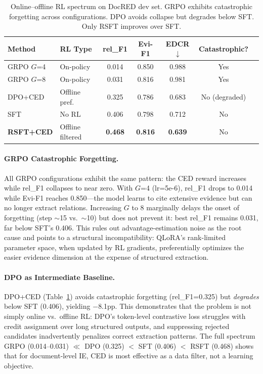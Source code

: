 \documentclass[11pt,a4paper]{article}
\newcommand{\ced}{CED}
\newcommand{\edcr}{EDCR}
\newcommand{\rsft}{RSFT}
\begin{document}
\begin{table}[t]
\centering
\small
\caption{Online--offline RL spectrum on DocRED dev set. GRPO exhibits catastrophic forgetting across configurations. DPO avoids collapse but degrades below SFT. Only \rsft{} improves over SFT.}
\label{tab:rl_spectrum}
\begin{tabular}{@{}llccccc@{}}
\toprule
\textbf{Method} & \textbf{RL Type} & \textbf{rel\_F1} & \textbf{Evi-F1} & \textbf{\edcr{}$\downarrow$} & \textbf{Catastrophic?} \\
\midrule
GRPO $G$=4    & On-policy   & 0.014 & 0.850 & 0.988 & Yes \\
GRPO $G$=8    & On-policy   & 0.031 & 0.816 & 0.981 & Yes \\
DPO+CED       & Offline pref. & 0.325 & 0.786 & 0.683 & No (degraded) \\
SFT            & No RL       & 0.406 & 0.798 & 0.712 & No \\
\textbf{\rsft{}+CED} & Offline filtered & \textbf{0.468} & \textbf{0.816} & \textbf{0.639} & No \\
\bottomrule
\end{tabular}
\end{table}

\paragraph{GRPO Catastrophic Forgetting.}
All GRPO configurations exhibit the same pattern: the CED reward increases while rel\_F1 collapses to near zero.
With $G$=4 (lr=5e-6), rel\_F1 drops to 0.014 while Evi-F1 reaches 0.850---the model learns to cite extensive evidence but can no longer extract relations.
Increasing $G$ to 8 marginally delays the onset of forgetting (step ${\sim}$15 vs.\ ${\sim}$10) but does not prevent it: best rel\_F1 remains 0.031, far below SFT's 0.406.
This rules out advantage-estimation noise as the root cause and points to a structural incompatibility: QLoRA's rank-limited parameter space, when updated by RL gradients, preferentially optimizes the easier evidence dimension at the expense of structured extraction.

\paragraph{DPO as Intermediate Baseline.}
DPO+CED (Table~\ref{tab:rl_spectrum}) avoids catastrophic forgetting (rel\_F1=0.325) but \emph{degrades} below SFT (0.406), yielding $-$8.1pp.
This demonstrates that the problem is not simply online vs.\ offline RL: DPO's token-level contrastive loss struggles with credit assignment over long structured outputs, and suppressing rejected candidates inadvertently penalizes correct extraction patterns.
The full spectrum GRPO (0.014--0.031) $\ll$ DPO (0.325) $<$ SFT (0.406) $<$ \rsft{} (0.468) shows that for document-level IE, \ced{} is most effective as a data filter, not a learning objective.
\end{document}
